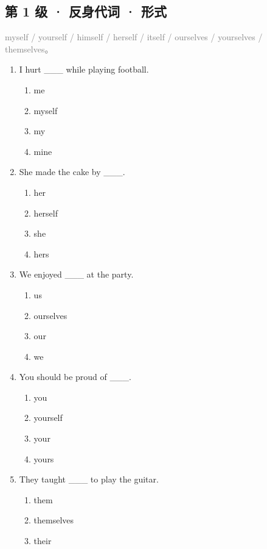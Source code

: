 \documentclass[11pt,a4paper]{ctexart}
\begin{document}
\subsection*{第 1 级 · 反身代词 · 形式}
\noindent\textcolor{gray}{myself / yourself / himself / herself / itself / ourselves / yourselves / themselves。}\par\smallskip
\begin{enumerate}[leftmargin=*,itemsep=4pt]
\item I hurt \_\_\_ while playing football.
\begin{enumerate}[label=\Alph*.,leftmargin=2em,itemsep=1pt,topsep=2pt]
\item me
\item myself
\item my
\item mine
\end{enumerate}
\item She made the cake by \_\_\_.
\begin{enumerate}[label=\Alph*.,leftmargin=2em,itemsep=1pt,topsep=2pt]
\item her
\item herself
\item she
\item hers
\end{enumerate}
\item We enjoyed \_\_\_ at the party.
\begin{enumerate}[label=\Alph*.,leftmargin=2em,itemsep=1pt,topsep=2pt]
\item us
\item ourselves
\item our
\item we
\end{enumerate}
\item You should be proud of \_\_\_.
\begin{enumerate}[label=\Alph*.,leftmargin=2em,itemsep=1pt,topsep=2pt]
\item you
\item yourself
\item your
\item yours
\end{enumerate}
\item They taught \_\_\_ to play the guitar.
\begin{enumerate}[label=\Alph*.,leftmargin=2em,itemsep=1pt,topsep=2pt]
\item them
\item themselves
\item their

\end{enumerate}
\end{enumerate}
\end{document}
